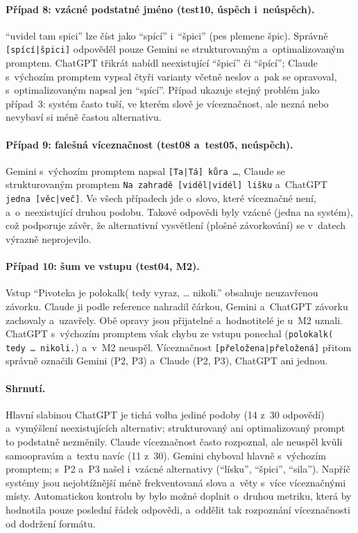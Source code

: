 \documentclass[11pt,a4paper]{article}
\begin{document}
\paragraph{Případ 8: vzácné podstatné jméno (test10, úspěch i~neúspěch).}
\enquote{uvidel tam spici} lze číst jako \enquote{spící} i~\enquote{špici}
(pes plemene špic). Správně \texttt{[spící|špici]} odpověděl pouze
Gemini se strukturovaným a~optimalizovaným promptem. ChatGPT třikrát
nabídl neexistující \enquote{špicí} či \enquote{špící}; Claude
s~výchozím promptem vypsal čtyři varianty včetně neslov a~pak se
opravoval, s~optimalizovaným napsal jen \enquote{spící}. Případ ukazuje
stejný problém jako případ~3: systém často tuší, ve kterém slově je
víceznačnost, ale nezná nebo nevybaví si méně častou alternativu.

\paragraph{Případ 9: falešná víceznačnost (test08 a~test05, neúspěch).}
Gemini s~výchozím promptem napsal \texttt{[Ta|Tá] kůra \dots}, Claude
se strukturovaným promptem \texttt{Na zahradě [viděl|vidél] lišku}
a~ChatGPT \texttt{jedna [věc|več]}. Ve všech případech jde o~slovo,
které víceznačné není, a~o~neexistující druhou podobu. Takové odpovědi
byly vzácné (jedna na systém), což podporuje závěr, že alternativní
vysvětlení (plošné závorkování) se v~datech výrazně neprojevilo.

\paragraph{Případ 10: šum ve vstupu (test04, M2).}
Vstup \enquote{Pivoteka je polokalk( tedy vyraz, \dots{} nikoli.}
obsahuje neuzavřenou závorku. Claude ji podle reference nahradil
čárkou, Gemini a~ChatGPT závorku zachovaly a~uzavřely. Obě opravy jsou
přijatelné a~hodnotitelé je u~M2 uznali. ChatGPT s~výchozím promptem
však chybu ze vstupu ponechal (\texttt{polokalk( tedy \dots{} nikoli.})
a~v~M2 neuspěl. Víceznačnost \texttt{[přeložena|přeložená]} přitom
správně označili Gemini (P2, P3) a~Claude (P2, P3), ChatGPT ani jednou.

\paragraph{Shrnutí.}
Hlavní slabinou ChatGPT je tichá volba jediné podoby (14 z~30 odpovědí)
a~vymýšlení neexistujících alternativ; strukturovaný ani optimalizovaný
prompt to podstatně nezměnily. Claude víceznačnost často rozpoznal, ale
neuspěl kvůli samoopravám a~textu navíc (11 z~30). Gemini chyboval
hlavně s~výchozím promptem; s~P2 a~P3 našel i~vzácné alternativy
(\enquote{lísku}, \enquote{špici}, \enquote{sila}). Napříč systémy jsou
nejobtížnější méně frekventovaná slova a~věty s~více víceznačnými
místy. Automatickou kontrolu by bylo možné doplnit o~druhou metriku,
která by hodnotila pouze poslední řádek odpovědi, a~oddělit tak
rozpoznání víceznačnosti od dodržení formátu.
\end{document}
